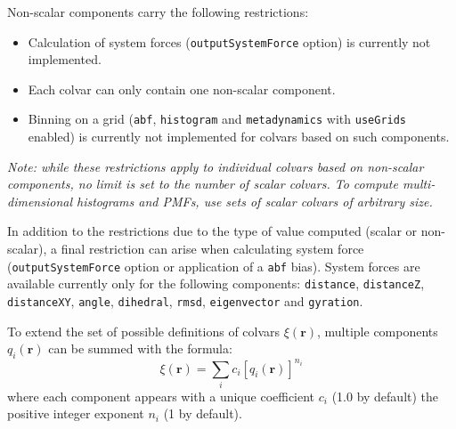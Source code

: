 Non-scalar components carry the following restrictions:
\begin{itemize}
\item Calculation of system forces (\texttt{outputSystemForce} option)
  is currently not implemented.
\item Each colvar can only contain one non-scalar component.
\item Binning on a grid (\texttt{abf}, \texttt{histogram} and
  \texttt{metadynamics} with \texttt{useGrids} enabled) is currently
  not implemented for colvars based on such components.
\end{itemize}

\emph{Note: while these restrictions apply to individual colvars based
  on non-scalar components, no limit is set to the number of scalar
  colvars.  To compute multi-dimensional histograms and PMFs, use sets
  of scalar colvars of arbitrary size.}


In addition to the restrictions due to the type of value computed (scalar or non-scalar),
a final restriction can arise when calculating system force
(\texttt{outputSystemForce} option or application of a \texttt{abf}
bias).  System forces are available currently only for the following
components: \texttt{distance}, \texttt{distanceZ},
\texttt{distanceXY}, \texttt{angle}, \texttt{dihedral}, \texttt{rmsd},
\texttt{eigenvector} and \texttt{gyration}.



\label{sec:cvc_superp}

To extend the set of possible definitions of colvars $\xi(\mathbf{r})$, multiple components
$q_i(\mathbf{r})$ can be summed with the formula:
\begin{equation}
  \label{eq:colvar_combination}
  \xi(\mathbf{r}) = \sum_i c_i [q_i(\mathbf{r})]^{n_i}
\end{equation}
where each component appears with a unique coefficient $c_i$ (1.0 by
default) the positive integer exponent $n_i$ (1 by default).

